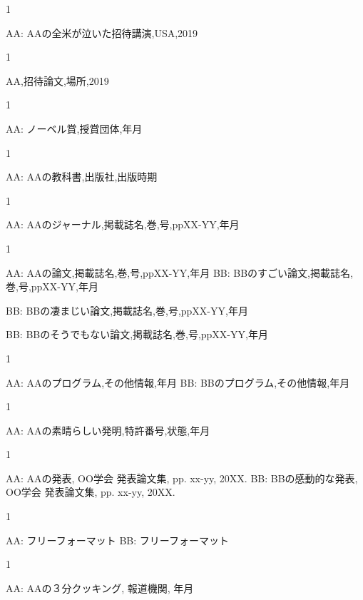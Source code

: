 \begin{招待講演}{1}

AA:
AAの全米が泣いた招待講演,USA,2019

\end{招待講演}

\begin{招待論文}{1}

AA,招待論文,場所,2019

\end{招待論文}

\begin{受賞}{1}

AA:
ノーベル賞,授賞団体,年月

\end{受賞}

\begin{著書}{1}

AA:
AAの教科書,出版社,出版時期
\end{著書}

\begin{雑誌論文}{1}

AA:
AAのジャーナル,掲載誌名,巻,号,ppXX-YY,年月
\end{雑誌論文}

\begin{査読付}{1}

AA:
AAの論文,掲載誌名,巻,号,ppXX-YY,年月
BB:
BBのすごい論文,掲載誌名,巻,号,ppXX-YY,年月

BB:
BBの凄まじい論文,掲載誌名,巻,号,ppXX-YY,年月

BB:
BBのそうでもない論文,掲載誌名,巻,号,ppXX-YY,年月
\end{査読付}

\begin{公開}{1}

AA:
AAのプログラム,その他情報,年月
BB:
BBのプログラム,その他情報,年月
\end{公開}

\begin{特許}{1}

AA:
AAの素晴らしい発明,特許番号,状態,年月

\end{特許}

\begin{発表}{1}

 AA:
 AAの発表,  OO学会 発表論文集, pp. xx-yy, 20XX.
BB:
 BBの感動的な発表,  OO学会 発表論文集, pp. xx-yy, 20XX.
\end{発表}

\begin{特記}{1}

AA:
フリーフォーマット
BB:
フリーフォーマット
\end{特記}

\begin{報道}{1}

AA:
AAの３分クッキング, 報道機関, 年月

\end{報道}
